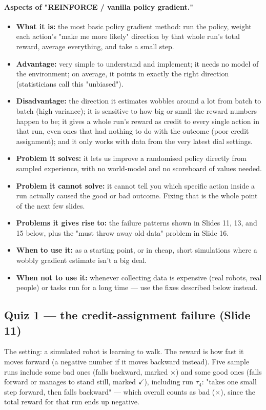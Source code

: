 \documentclass[11pt]{article}
\begin{document}
\paragraph{Aspects of "REINFORCE / vanilla policy gradient."}
\begin{itemize}[leftmargin=*]
  \item \textbf{What it is:} the most basic policy gradient method: run the policy, weight each action's "make me more likely" direction by that whole run's total reward, average everything, and take a small step.
  \item \textbf{Advantage:} very simple to understand and implement; it needs no model of the environment; on average, it points in exactly the right direction (statisticians call this "unbiased").
  \item \textbf{Disadvantage:} the direction it estimates wobbles around a lot from batch to batch (high variance); it is sensitive to how big or small the reward numbers happen to be; it gives a whole run's reward as credit to every single action in that run, even ones that had nothing to do with the outcome (poor credit assignment); and it only works with data from the very latest dial settings.
  \item \textbf{Problem it solves:} it lets us improve a randomised policy directly from sampled experience, with no world-model and no scoreboard of values needed.
  \item \textbf{Problem it cannot solve:} it cannot tell you which specific action inside a run actually caused the good or bad outcome. Fixing that is the whole point of the next few slides.
  \item \textbf{Problems it gives rise to:} the failure patterns shown in Slides 11, 13, and 15 below, plus the "must throw away old data" problem in Slide 16.
  \item \textbf{When to use it:} as a starting point, or in cheap, short simulations where a wobbly gradient estimate isn't a big deal.
  \item \textbf{When not to use it:} whenever collecting data is expensive (real robots, real people) or tasks run for a long time --- use the fixes described below instead.
\end{itemize}

\subsection{Quiz 1 --- the credit-assignment failure (Slide 11)}
The setting: a simulated robot is learning to walk. The reward is how fast it moves forward (a negative number if it moves backward instead). Five sample runs include some bad ones (falls backward, marked $\times$) and some good ones (falls forward or manages to stand still, marked $\checkmark$), including run $\tau_4$: "takes one small step forward, then falls backward" --- which overall counts as bad ($\times$), since the total reward for that run ends up negative.
\end{document}
